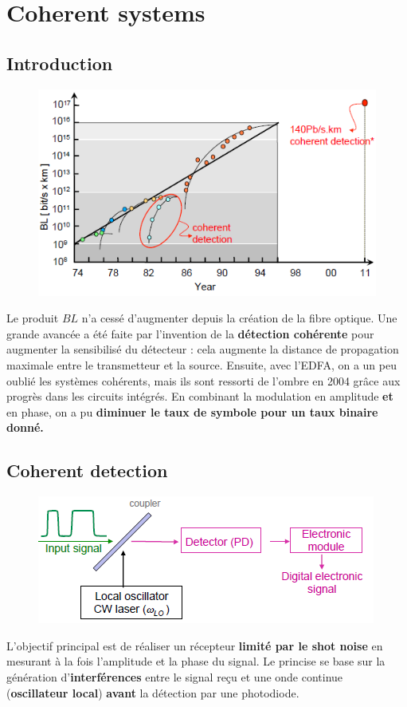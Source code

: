 \section{Coherent systems}
\subsection{Introduction}
\begin{figure}
	\vspace{-5mm}
	\includegraphics[scale=0.45]{ch6/image36}
	\end{figure}
Le produit $BL$ n'a cessé d'augmenter depuis la création de la fibre optique. Une grande avancée
a été faite par l'invention de la \textbf{détection cohérente} pour augmenter la sensibilisé du
détecteur : cela augmente la distance de propagation maximale entre le transmetteur et la source. 
Ensuite, avec l'EDFA, on a un peu oublié les systèmes cohérents, mais ils sont ressorti de 
l'ombre en 2004 grâce aux progrès dans les circuits intégrés. En combinant la modulation en 
amplitude \textbf{et} en phase, on a pu \textbf{diminuer le taux de symbole pour un taux binaire
donné.}

\subsection{Coherent detection}
\begin{figure}
	\vspace{-5mm}
	\includegraphics[scale=0.45]{ch6/image37}
	\end{figure}
L'objectif principal est de réaliser un récepteur \textbf{limité par le shot noise} en mesurant
à la fois l'amplitude et la phase du signal. Le princise se base sur la génération 
d'\textbf{interférences} entre le signal reçu et une onde continue (\textbf{oscillateur local}) 
\textbf{avant} la détection par une photodiode. \\


